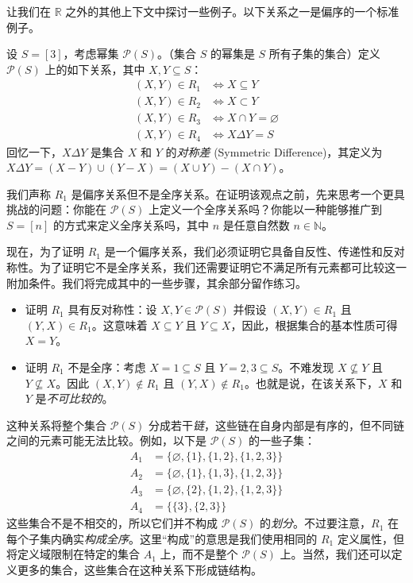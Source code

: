 让我们在 $\mathbb{R}$ 之外的其他上下文中探讨一些例子。以下关系之一是偏序的一个标准例子。\\

\begin{example}
    设 $S=[3]$，考虑幂集 $\mathcal{P}(S)$。（集合 $S$ 的幂集是 $S$ 所有子集的集合）定义 $\mathcal{P}(S)$ 上的如下关系，其中 $X, Y \subseteq S$：
    \begin{align*}
        (X, Y) \in R_1 &\iff X \subseteq Y \\
        (X, Y) \in R_2 &\iff X \subset Y \\
        (X, Y) \in R_3 &\iff X \cap Y = \varnothing \\
        (X, Y) \in R_4 &\iff X \Delta Y = S
    \end{align*}
    回忆一下，$X \Delta Y$ 是集合 $X$ 和 $Y$ 的\emph{对称差} (Symmetric Difference)，其定义为 $X \Delta Y = (X - Y) \cup (Y - X) = (X \cup Y) - (X \cap Y)$。

    我们声称 $R_1$ 是偏序关系但不是全序关系。在证明该观点之前，先来思考一个更具挑战的问题：你能在 $\mathcal{P}(S)$ 上定义一个全序关系吗？你能以一种能够推广到 $S = [n]$ 的方式来定义全序关系吗，其中 $n$ 是任意自然数 $n \in \mathbb{N}$。

    现在，为了证明 $R_1$ 是一个偏序关系，我们必须证明它具备自反性、传递性和反对称性。为了证明它不是全序关系，我们还需要证明它不满足所有元素都可比较这一附加条件。我们将完成其中的一些步骤，其余部分留作练习。

    \begin{itemize}
        \item 证明 $R_1$ 具有反对称性：设 $X, Y \in \mathcal{P}(S)$ 并假设 $(X,Y) \in R_1$ 且 $(Y,X) \in R_1$。这意味着 $X \subseteq Y$ 且 $Y \subseteq X$，因此，根据集合的基本性质可得 $X=Y$。
        \item 证明 $R_1$ 不是全序：考虑 $X = {1} \subseteq S$ 且 $Y = {2, 3} \subseteq S$。不难发现 $X \nsubseteq Y$ 且 $Y \nsubseteq X$。因此 $(X,Y) \notin R_1$ 且 $(Y,X) \notin R_1$。也就是说，在该关系下，$X$ 和 $Y$ 是\emph{不可比较的}。
    \end{itemize}
\end{example}

这种关系将整个集合 $\mathcal{P}(S)$ 分成若干\emph{链}，这些链在自身内部是有序的，但不同链之间的元素可能无法比较。例如，以下是 $\mathcal{P}(S)$ 的一些子集：
    \begin{align*}
        A_1 &= \big\{\varnothing, \{1\} , \{1, 2\} , \{1, 2, 3\}\big\} \\
        A_2 &= \big\{\varnothing, \{1\} , \{1, 3\} , \{1, 2, 3\}\big\} \\
	    A_3 &= \big\{\varnothing, \{2\} , \{1, 2\} , \{1, 2, 3\}\big\} \\
        A_4 &= \big\{\{3\} , \{2, 3\}\big\}
    \end{align*}
这些集合不是不相交的，所以它们并不构成 $\mathcal{P}(S)$ 的\emph{划分}。不过要注意，$R_1$ 在每个子集内确实\emph{构成全序}。这里``构成''的意思是我们使用相同的 $R_1$ 定义属性，但将定义域限制在特定的集合 $A_1$ 上，而不是整个 $\mathcal{P}(S)$ 上。当然，我们还可以定义更多的集合，这些集合在这种关系下形成链结构。\\

